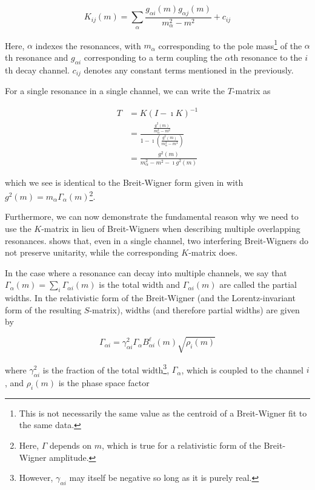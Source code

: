 \begin{equation}
  K_{ij}(m) = \sum_{\alpha} \frac{g_{\alpha i}(m) g_{\alpha j}(m)}{m_\alpha^2 - m^2} + c_{ij}
  \label{eq:k-matrix-parameterization}
\end{equation}

Here, $\alpha$ indexes the resonances, with $m_\alpha$ corresponding to the pole mass\footnote{This is not necessarily the same value as the centroid of a Breit-Wigner fit to the same data.} of the $\alpha$th resonance and $g_{\alpha i}$ corresponding to a term coupling the $\alpha$th resonance to the $i$th decay channel. $c_{ij}$ denotes any constant terms mentioned in the previously.

For a single resonance in a single channel, we can write the $T$-matrix as

\begin{align}
  T &= K(I-\imath K)^{-1} \\
    &= \frac{\frac{g^2(m)}{m_\alpha^2 - m^2}}{1 - \imath \left(\frac{g^2(m)}{m_\alpha^2 - m^2}\right)} \\
    &= \frac{g^2(m)}{m_\alpha^2 - m^2 - \imath g^2(m)}
\end{align}

which we see is identical to the Breit-Wigner form given in  with $g^2(m) = m_\alpha\Gamma_\alpha(m)$\footnote{Here, $\Gamma$ depends on $m$, which is true for a relativistic form of the Breit-Wigner amplitude.}.

Furthermore, we can now demonstrate the fundamental reason why we need to use the $K$-matrix in lieu of Breit-Wigners when describing multiple overlapping resonances.  shows that, even in a single channel, two interfering Breit-Wigners do not preserve unitarity, while the corresponding $K$-matrix does.

In the case where a resonance can decay into multiple channels, we say that $\Gamma_\alpha(m) = \sum_i \Gamma_{\alpha i}(m)$ is the total width and $\Gamma_{\alpha i}(m)$ are called the partial widths. In the relativistic form of the Breit-Wigner (and the Lorentz-invariant form of the resulting $S$-matrix), widths (and therefore partial widths) are given by

\begin{equation}
  \Gamma_{\alpha i} = \gamma^2_{\alpha i} \Gamma_{\alpha} B^\ell_{\alpha i}(m) \sqrt{\rho_i(m)}
  \label{eq:partial-width}
\end{equation}

where $\gamma^2_{\alpha i}$ is the fraction of the total width\footnote{However, $\gamma_{\alpha i}$ may itself be negative so long as it is purely real.}, $\Gamma_\alpha$, which is coupled to the channel $i$, and $\rho_i(m)$ is the phase space factor

